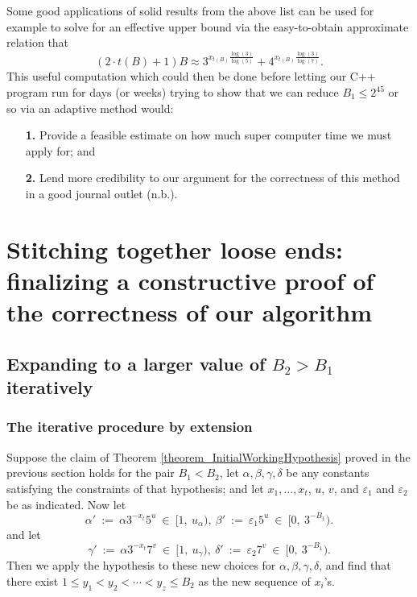 \documentclass[12pt]{article}
\begin{document}
Some good applications of solid results from the above list can be used for example to solve for an 
effective upper bound via the easy-to-obtain approximate relation that 
\begin{equation} 
\label{eqn_t_xt_B_relation} 
(2 \cdot t(B)+1) B \approx 3^{x_{t(B)} \frac{\log(3)}{\log(5)}} + 4^{x_{t(B)} \frac{\log(3)}{\log(7)}}. 
\end{equation} 
This useful computation which could then be done before letting our C++ program run for days (or weeks) 
trying to show that we can reduce $B_1 \leq 2^{45}$ or so via an adaptive method would: 
\begin{itemize}
\item[\textbf{1.}] 
Provide a feasible estimate on how much super computer time we must apply for; and 
\item[\textbf{2.}]
Lend more 
credibility to our argument for the correctness of this method in a good journal outlet (n.b.). 
\end{itemize}  

\section{Stitching together loose ends: finalizing a constructive proof of the correctness of our algorithm} 

\subsection{Expanding to a larger value of $B_2 > B_1$ iteratively}

\subsubsection{The iterative procedure by extension} 

Suppose the claim of Theorem \ref{theorem_InitialWorkingHypothesis} 
proved in the previous section holds for the pair 
$B_1 < B_2$, let $\alpha, \beta, \gamma, \delta$ be any constants 
satisfying the constraints of that hypothesis; and let $x_1, ..., x_t$,
$u$, $v$, and $\varepsilon_1$ and $\varepsilon_2$ be as indicated.  
Now let 
$$
\alpha'\ :=\ \alpha 3^{-x_t}5^u\ \in\ [1,\ u_{\alpha}),\ \beta'\ :=\ \varepsilon_1 5^u\ \in\ 
[0,\ 3^{-B_1}).
$$  
and let
$$
\gamma'\ :=\ \alpha 3^{-x_t}7^v\ \in\ [1,\ u_{\gamma}),\ 
\delta'\ :=\ \varepsilon_2 7^v\ \in\ [0,\ 3^{-B_1}).
$$
Then we apply the hypothesis to these new choices for $\alpha, \beta, \gamma,
\delta$, and find that there exist 
$1 \leq y_1 < y_2 < \cdots < y_z \leq B_2$ as the new sequence of $x_i$'s.  
\end{document}
